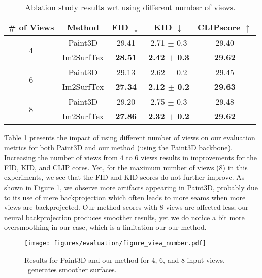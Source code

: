 \begin{table}[!t]
\centering
\begin{adjustbox}{width=0.45\textwidth}
\begin{tabular}{cc|ccc}
\toprule
 \# of Views &  Method &  FID $\downarrow$ &  KID $\downarrow$ &  CLIPscore $\uparrow$ \\
\midrule
\multirow{2}{*}{ 4} &  Paint3D &  29.41  &  2.71 $\pm$ 0.3  &  29.40\\
 &  Im2SurfTex &  \textbf{28.51}  &  \textbf{2.42 $\pm$ 0.3}  &  \textbf{29.62}\\
\hline
\multirow{2}{*}{ 6} &  Paint3D &  29.13 &  2.62 $\pm$ 0.2  &  29.45\\
&  Im2SurfTex &  \textbf{27.34}  &  \textbf{2.12 $\pm$ 0.2} &  \textbf{29.63}\\
\hline
\multirow{2}{*}{ 8} &  Paint3D &  29.20  &  2.75 $\pm$ 0.3  &  29.48\\
 &  Im2SurfTex &  \textbf{27.86} &  \textbf{2.32 $\pm$ 0.2}  &  \textbf{29.62}\\

\bottomrule
\end{tabular}
\end{adjustbox}
\caption{ Ablation study results wrt using different number of views.}
\label{tab:ablation-number-views}
\vspace*{-4mm}
\end{table}

Table \ref{tab:ablation-number-views} presents the impact of using different number of views on our evaluation metrics for both Paint3D and our method (using the Paint3D backbone). Increasing the number of views from $4$ to $6$ views results in improvements for the FID, KID, and CLIP cores. Yet, for the maximum number of views ($8$) in this experiments, we see that the FID and KID scores do not further improve. As shown in Figure \ref{fig:numverofviewsnumber}, we observe more artifacts appearing in Paint3D, probably due to its use of mere backprojection which often leads to more seams when more views are backprojected. Our method scores with $8$ views are affected less; our neural backprojection produces smoother results, yet we do notice a bit more oversmoothing in our case, which is a limitation our our method.

\begin{figure}[!t]
    \texttt{[image: figures/evaluation/figure\_view\_number.pdf]}
    \caption{Results for Paint3D and our method for $4$, $6$, and $8$ input views. \method\ generates smoother surfaces.}
    \label{fig:numverofviewsnumber}
    \vspace*{-1mm}
\end{figure}

